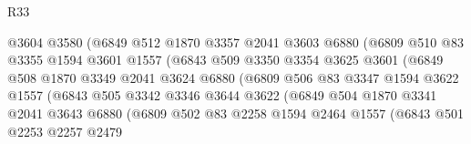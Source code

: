 \begin{lexlean}{R33}
\begin{coremodule}
                            @3604
                            @3580
                            (@6849
                              @512
                              @1870
                              @3357
                              @2041
                              @3603
                              @6880
                              (@6809
                                @510
                                @83
                                @3355
                                @1594
                                @3601
                                @1557
                                (@6843
                                  @509
                                  @3350
                                  @3354
                                  @3625
                                  @3601
                                  (@6849
                                    @508
                                    @1870
                                    @3349
                                    @2041
                                    @3624
                                    @6880
                                    (@6809
                                      @506
                                      @83
                                      @3347
                                      @1594
                                      @3622
                                      @1557
                                      (@6843
                                        @505
                                        @3342
                                        @3346
                                        @3644
                                        @3622
                                        (@6849
                                          @504
                                          @1870
                                          @3341
                                          @2041
                                          @3643
                                          @6880
                                          (@6809
                                            @502
                                            @83
                                            @2258
                                            @1594
                                            @2464
                                            @1557
                                            (@6843
                                              @501
                                              @2253
                                              @2257
                                              @2479

\end{coremodule}
\end{lexlean}
